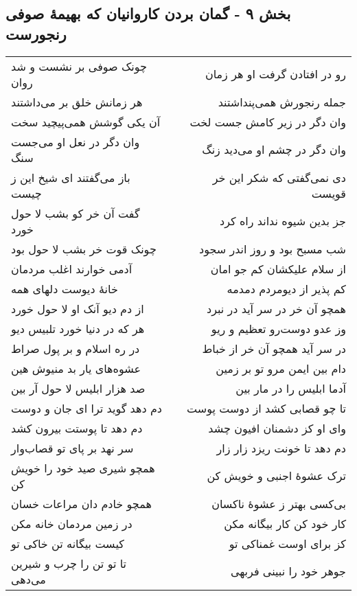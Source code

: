 \begin{center}
\section*{بخش ۹ - گمان بردن کاروانیان که بهیمهٔ صوفی رنجورست}
\label{sec:sh009}
\begin{longtable}{l p{0.5cm} r}
چونک صوفی بر نشست و شد روان
&&
رو در افتادن گرفت او هر زمان
\\
هر زمانش خلق بر می‌داشتند
&&
جمله رنجورش همی‌پنداشتند
\\
آن یکی گوشش همی‌پیچید سخت
&&
وان دگر در زیر کامش جست لخت
\\
وان دگر در نعل او می‌جست سنگ
&&
وان دگر در چشم او می‌دید زنگ
\\
باز می‌گفتند ای شیخ این ز چیست
&&
دی نمی‌گفتی که شکر این خر قویست
\\
گفت آن خر کو بشب لا حول خورد
&&
جز بدین شیوه نداند راه کرد
\\
چونک قوت خر بشب لا حول بود
&&
شب مسبح بود و روز اندر سجود
\\
آدمی خوارند اغلب مردمان
&&
از سلام علیکشان کم جو امان
\\
خانهٔ دیوست دلهای همه
&&
کم پذیر از دیومردم دمدمه
\\
از دم دیو آنک او لا حول خورد
&&
همچو آن خر در سر آید در نبرد
\\
هر که در دنیا خورد تلبیس دیو
&&
وز عدو دوست‌رو تعظیم و ریو
\\
در ره اسلام و بر پول صراط
&&
در سر آید همچو آن خر از خباط
\\
عشوه‌های یار بد منیوش هین
&&
دام بین ایمن مرو تو بر زمین
\\
صد هزار ابلیس لا حول آر بین
&&
آدما ابلیس را در مار بین
\\
دم دهد گوید ترا ای جان و دوست
&&
تا چو قصابی کشد از دوست پوست
\\
دم دهد تا پوستت بیرون کشد
&&
وای او کز دشمنان افیون چشد
\\
سر نهد بر پای تو قصاب‌وار
&&
دم دهد تا خونت ریزد زار زار
\\
همچو شیری صید خود را خویش کن
&&
ترک عشوهٔ اجنبی و خویش کن
\\
همچو خادم دان مراعات خسان
&&
بی‌کسی بهتر ز عشوهٔ ناکسان
\\
در زمین مردمان خانه مکن
&&
کار خود کن کار بیگانه مکن
\\
کیست بیگانه تن خاکی تو
&&
کز برای اوست غمناکی تو
\\
تا تو تن را چرب و شیرین می‌دهی
&&
جوهر خود را نبینی فربهی
\\

\end{longtable}
\end{center}
